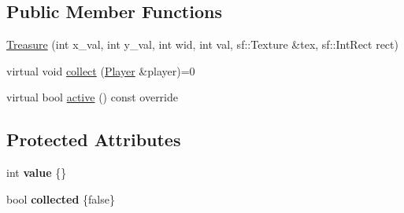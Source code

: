 \subsection*{Public Member Functions}
\begin{DoxyCompactItemize}
\item 
\hyperlink{classTreasure_abdc8e911a0a71955c73847dd726964aa}{Treasure} (int x\+\_\+val, int y\+\_\+val, int wid, int val, sf\+::\+Texture \&tex, sf\+::\+Int\+Rect rect)
\item 
virtual void \hyperlink{classTreasure_a55f46cc5e888315d78c423e6d0af102d}{collect} (\hyperlink{classPlayer}{Player} \&player)=0
\item 
virtual bool \hyperlink{classTreasure_adfa94654619fbe6f193df512e65db083}{active} () const override
\end{DoxyCompactItemize}
\subsection*{Protected Attributes}
\begin{DoxyCompactItemize}
\item 
\hypertarget{classTreasure_a8afb4798dba836b0bf27e06e36932dec}{int {\bfseries value} \{\}}\label{classTreasure_a8afb4798dba836b0bf27e06e36932dec}

\item 
\hypertarget{classTreasure_a08327d05d975fa573f57a1c8887a94dd}{bool {\bfseries collected} \{false\}}\label{classTreasure_a08327d05d975fa573f57a1c8887a94dd}

\end{DoxyCompactItemize}


